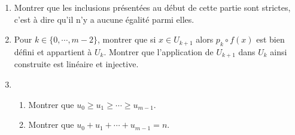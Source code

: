 \begin{enumerate}
 \item Montrer que les inclusions présentées au début de cette partie sont strictes, c'est à dire qu'il n'y a aucune égalité parmi elles.

 \item Pour $k\in \{0,\cdots,m-2\}$, montrer que si $x\in U_{k+1}$ alors $p_k\circ f(x)$ est bien défini et appartient à $U_k$. Montrer que l'application de $U_{k+1}$ dans $U_k$ ainsi construite est linéaire et injective. 
 \item 
\begin{enumerate}
 \item Montrer que $u_0 \geq u_1\geq \cdots \geq u_{m-1}$.
 \item Montrer que $u_0 + u_1 + \cdots + u_{m-1} = n$.
\end{enumerate}


\end{enumerate}
